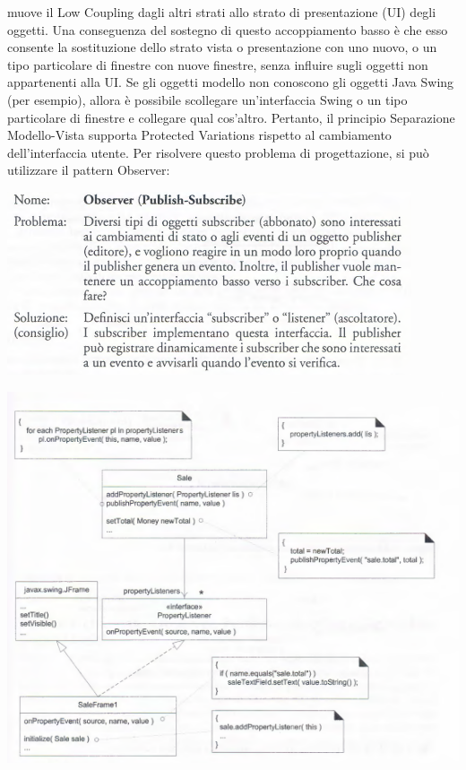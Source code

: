 \documentclass[a4paper,12pt, oneside]{book}
\begin{document}
muove il Low Coupling dagli altri strati allo strato di presentazione (UI) degli oggetti.
Una conseguenza del sostegno di questo accoppiamento basso è che esso consente la
sostituzione dello strato vista o presentazione con uno nuovo, o un tipo particolare di
finestre con nuove finestre, senza influire sugli oggetti non appartenenti alla UI. Se gli
oggetti modello non conoscono gli oggetti Java Swing (per esempio), allora è possibile
scollegare un'interfaccia Swing o un tipo particolare di finestre e collegare qual cos'altro.
Pertanto, il principio Separazione Modello-Vista supporta Protected Variations rispetto
al cambiamento dell'interfaccia utente.
Per risolvere questo problema di progettazione, si può utilizzare il pattern Observer:
\begin{center}
\includegraphics[scale = 0.7]{img/gof19.png}
\end{center}
\begin{center}
\includegraphics[scale = 0.7]{img/gof20.png}
\end{center}
\end{document}
